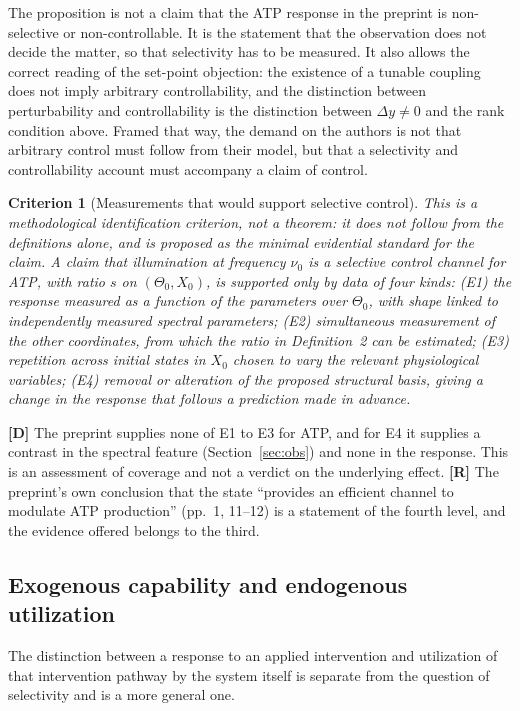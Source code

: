 \documentclass[11pt]{article}
\newcommand{\stR}{\textbf{\textcolor{blue!55!black}{[R]}}}
\newcommand{\stD}{\textbf{\textcolor{green!40!black}{[D]}}}
\theoremstyle{plain}
\newtheorem{criterion}{Criterion}
\theoremstyle{definition}
\theoremstyle{remark}
\begin{document}
The proposition is not a claim that the ATP response in the preprint is non-selective or non-controllable. It is the statement that the observation does not decide the matter, so that selectivity has to be measured. It also allows the correct reading of the set-point objection: the existence of a tunable coupling does not imply arbitrary controllability, and the distinction between perturbability and controllability is the distinction between $\Delta y\ne0$ and the rank condition above. Framed that way, the demand on the authors is not that arbitrary control must follow from their model, but that a selectivity and controllability account must accompany a claim of control.

\begin{criterion}[Measurements that would support selective control]
\label{crit:support}
This is a methodological identification criterion, not a theorem: it does not follow from the definitions alone, and is proposed as the minimal evidential standard for the claim. A claim that illumination at frequency $\nu_0$ is a selective control channel for ATP, with ratio $s$ on $(\Theta_0,X_0)$, is supported only by data of four kinds: (E1) the response measured as a function of the parameters over $\Theta_0$, with shape linked to independently measured spectral parameters; (E2) simultaneous measurement of the other coordinates, from which the ratio in Definition~2 can be estimated; (E3) repetition across initial states in $X_0$ chosen to vary the relevant physiological variables; (E4) removal or alteration of the proposed structural basis, giving a change in the response that follows a prediction made in advance.
\end{criterion}

\stD{} The preprint supplies none of E1 to E3 for ATP, and for E4 it supplies a contrast in the spectral feature (Section~\ref{sec:obs}) and none in the response. This is an assessment of coverage and not a verdict on the underlying effect. \stR{} The preprint's own conclusion that the state ``provides an efficient channel to modulate ATP production'' (pp.~1, 11--12) is a statement of the fourth level, and the evidence offered belongs to the third.

\subsection{Exogenous capability and endogenous utilization}
\label{sec:endo}

The distinction between a response to an applied intervention and utilization of that intervention pathway by the system itself is separate from the question of selectivity and is a more general one.
\end{document}
